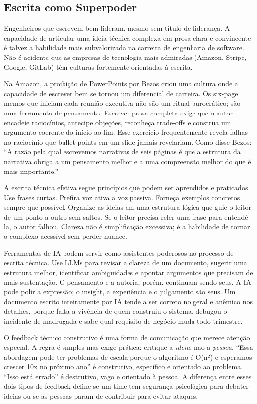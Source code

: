\subsection{Escrita como Superpoder}

Engenheiros que escrevem bem lideram, mesmo sem título de liderança. A
capacidade de articular uma ideia técnica complexa em prosa clara e
convincente é talvez a habilidade mais subvalorizada na carreira de
engenharia de software. Não é acidente que as empresas de tecnologia mais
admiradas (Amazon, Stripe, Google, GitLab) têm culturas fortemente
orientadas à escrita.

Na Amazon, a proibição de PowerPoints por Bezos criou uma cultura onde a
capacidade de escrever bem se tornou um diferencial de carreira. Os six-page
memos que iniciam cada reunião executiva não são um ritual burocrático; são
uma ferramenta de pensamento. Escrever prosa completa exige que o autor
encadeie raciocínios, antecipe objeções, reconheça trade-offs e construa um
argumento coerente do início ao fim. Esse exercício frequentemente revela
falhas no raciocínio que bullet points em um slide jamais revelariam. Como
disse Bezos: ``A razão pela qual escrevemos narrativas de seis páginas é que
a estrutura da narrativa obriga a um pensamento melhor e a uma compreensão
melhor do que é mais importante.''

A escrita técnica efetiva segue princípios que podem ser aprendidos e
praticados. Use frases curtas. Prefira voz ativa a voz passiva. Forneça
exemplos concretos sempre que possível. Organize as ideias em uma estrutura
lógica que guie o leitor de um ponto a outro sem saltos. Se o leitor precisa
reler uma frase para entendê-la, o autor falhou. Clareza não é simplificação
excessiva; é a habilidade de tornar o complexo acessível sem perder nuance.

Ferramentas de IA podem servir como assistentes poderosos no processo de
escrita técnica. Use LLMs para revisar a clareza de um documento, sugerir
uma estrutura melhor, identificar ambiguidades e apontar argumentos que
precisam de mais sustentação. O pensamento e a autoria, porém, continuam sendo seus. A IA pode polir a expressão; o insight, a
experiência e o julgamento são seus. Um documento escrito inteiramente por IA
tende a ser correto no geral e anêmico nos detalhes, porque falta a vivência de
quem construiu o sistema, debugou o incidente de madrugada e sabe qual
requisito de negócio muda todo trimestre.

O feedback técnico construtivo é uma forma de comunicação que merece atenção
especial. A regra é simples mas exige prática: critique a \textit{ideia}, não
a \textit{pessoa}. ``Essa abordagem pode ter problemas de escala porque o
algoritmo é O(n²) e esperamos crescer 10x no próximo ano'' é construtivo,
específico e orientado ao problema. ``Isso está errado'' é destrutivo, vago
e orientado à pessoa. A diferença entre esses dois tipos de feedback define
se um time tem segurança psicológica para debater ideias ou se as pessoas
param de contribuir para evitar ataques.

